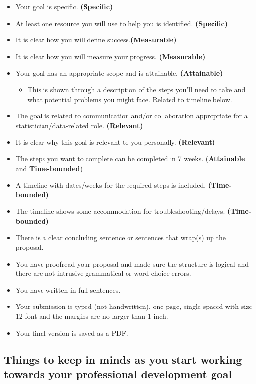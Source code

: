 \documentclass[
  openany]{book}
\providecommand{\tightlist}{%
  \setlength{\itemsep}{0pt}\setlength{\parskip}{0pt}}
\begin{document}
\begin{itemize}
\item
  Your goal is specific. \textbf{(Specific)}
\item
  At least one resource you will use to help you is identified. \textbf{(Specific)}
\item
  It is clear how you will define success.\textbf{(Measurable)}
\item
  It is clear how you will measure your progress. \textbf{(Measurable)}
\item
  Your goal has an appropriate scope and is attainable. \textbf{(Attainable)}

  \begin{itemize}
  \tightlist
  \item
    This is shown through a description of the steps you'll need to take and what potential problems you might face. Related to timeline below.
  \end{itemize}
\item
  The goal is related to communication and/or collaboration appropriate for a statistician/data-related role. \textbf{(Relevant)}
\item
  It is clear why this goal is relevant to you personally. \textbf{(Relevant)}
\item
  The steps you want to complete can be completed in 7 weeks. (\textbf{Attainable} and \textbf{Time-bounded})
\item
  A timeline with dates/weeks for the required steps is included. \textbf{(Time-bounded)}
\item
  The timeline shows some accommodation for troubleshooting/delays. \textbf{(Time-bounded)}
\item
  There is a clear concluding sentence or sentences that wrap(s) up the proposal.
\item
  You have proofread your proposal and made sure the structure is logical and there are not intrusive grammatical or word choice errors.
\item
  You have written in full sentences.
\item
  Your submission is typed (not handwritten), one page, single-spaced with size 12 font and the margins are no larger than 1 inch.
\item
  Your final version is saved as a PDF.
\end{itemize}

\hypertarget{things-to-keep-in-minds-as-you-start-working-towards-your-professional-development-goal}{%
\subsection{Things to keep in minds as you start working towards your professional development goal}\label{things-to-keep-in-minds-as-you-start-working-towards-your-professional-development-goal}}
\end{document}

